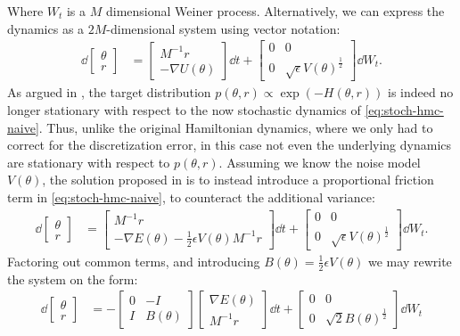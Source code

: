 Where $W_t$ is a $M$ dimensional Weiner process.
Alternatively, we can express the dynamics as a $2M$-dimensional system using vector notation:
\begin{align} \label{eq:stoch-hmc-naive}
    \dd{\begin{bmatrix}\theta \\ r \end{bmatrix}} &= 
    \begin{bmatrix}
        M^{-1}r \\ -\nabla{U}(\theta) 
    \end{bmatrix} \dd{t} + \begin{bmatrix}
        0 & 0 \\ 
        0 & \sqrt{\epsilon} V(\theta)^{\frac{1}{2}}
    \end{bmatrix} \dd{W_t}.
\end{align}
As argued in \cite{chen_stochastic_2014}, the target distribution $p(\theta, r)\propto \exp(-H(\theta, r))$ is indeed no longer stationary with respect to the now stochastic dynamics of \cref{eq:stoch-hmc-naive}.
Thus, unlike the original Hamiltonian dynamics, where we only had to correct for the discretization error, in this case not even the underlying dynamics are stationary with respect to $p(\theta, r)$.
Assuming we know the noise model $V(\theta)$, the solution proposed in \cite{chen_stochastic_2014} is to instead introduce a proportional friction term in \cref{eq:stoch-hmc-naive}, to counteract the additional variance:
\begin{align} \label{eq:stoch-hmc-w-friction}
    \dd{\begin{bmatrix}\theta \\ r \end{bmatrix}} &= 
    \begin{bmatrix}
        M^{-1}r \\ -\nabla{E}(\theta)-\frac{1}{2}\epsilon V(\theta)M^{-1}r
    \end{bmatrix} \dd{t} + \begin{bmatrix}
        0 & 0 \\ 
        0 & \sqrt{\epsilon} V(\theta)^{\frac{1}{2}}
    \end{bmatrix} \dd{W_t}.
\end{align}
Factoring out common terms, and introducing $B(\theta) = \frac{1}{2}\epsilon V(\theta)$ we may rewrite the system on the form:
\begin{align}
    \dd{\begin{bmatrix}\theta \\ r \end{bmatrix}} &= 
    -\begin{bmatrix}
        0 & -I \\ 
        I & B(\theta)
    \end{bmatrix} \begin{bmatrix}
        \nabla{E}(\theta)  \\ M^{-1}r
    \end{bmatrix}\dd{t} + \begin{bmatrix}
        0 & 0 \\ 
        0 & \sqrt{2} B(\theta)^{\frac{1}{2}}
    \end{bmatrix} \dd{W_t} 
\end{align}
